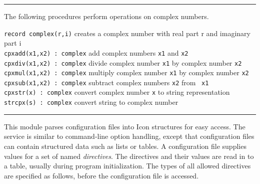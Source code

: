 
\vspace{0.25cm}\hrule{}

The following procedures perform operations on complex numbers. 

\noindent \texttt{record complex(r,i)} creates a complex number with real part r
and imaginary part i\\
\texttt{cpxadd(x1,x2) : complex} add complex numbers \texttt{x1} and
\texttt{x2}\\
\texttt{cpxdiv(x1,x2) : complex} divide complex number \texttt{x1} by
complex number \texttt{x2}\\
\texttt{cpxmul(x1,x2) : complex} multiply complex number \texttt{x1} by
complex number \texttt{x2}\\
\texttt{cpxsub(x1,x2) : complex} subtract complex numbers \texttt{x2}
from \ \texttt{x1}\\
\texttt{cpxstr(x) : complex} convert complex number \texttt{x} to string
representation\\
\texttt{strcpx(s) : complex} convert string to complex number 

\vspace{0.25cm}\hrule{}

This module parses configuration files into Icon
structures for easy access. The service is similar to 
command-line option handling, except that configuration files can
contain structured data such as lists or tables. A configuration file
supplies values for a set of named \textit{directives}. The directives
and their values are read in to a table, usually during program
initialization. The types of all allowed directives are specified as
follows, before the configuration file is accessed.


